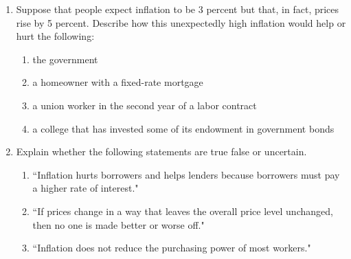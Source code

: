 \documentclass{article}
\begin{document}
\begin{enumerate}
\newpage

\item Suppose that people expect inflation to be 3 percent but that, in fact, prices rise by 5 percent. Describe how this unexpectedly high inflation would help or hurt the following:

	\begin{enumerate}
	
	\item the government
	
	\item a homeowner with a fixed-rate mortgage
	
	\item a union worker in the second year of a labor contract
	
	\item a college that has invested some of its endowment in government bonds
	
	\end{enumerate}
	
\item Explain whether the following statements are true false or uncertain.

	\begin{enumerate}

	\item ``Inflation hurts borrowers and helps lenders because borrowers must pay a higher rate of interest."
	
	\item ``If prices change in a way that leaves the overall price level unchanged, then no one is made better or worse off."
	
	\item ``Inflation does not reduce the purchasing power of most workers."
	
	\end{enumerate}

\end{enumerate}
\end{document}

